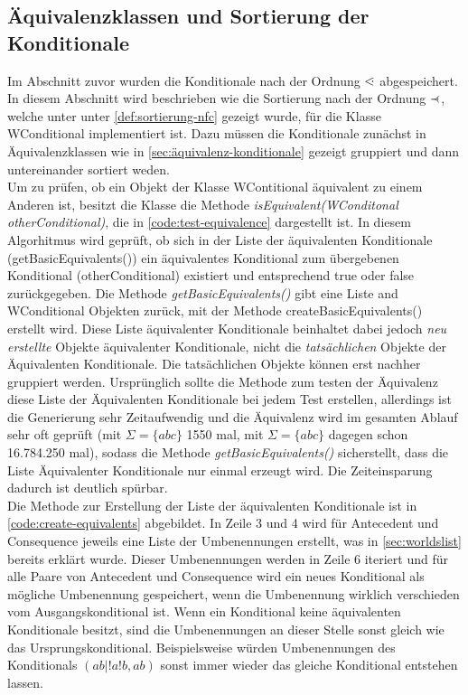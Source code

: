 \documentclass[12pt,a4paper]{article}
\newcommand\dotl{\mathrel{%
    \mathchoice{\QEQ}{\QEQ}{\QEQ}{\QEQ}%
}}
\def\QEQ{{%
    \setbox0\hbox{<}%
    \rlap{\hbox to \wd0{\hss \raisebox {0.1pt}{$\ \cdot$\hss}}}\box0
}}
\newcommand\rdotl{\mathrel{%
    \mathchoice{\RQEQ}{\RQEQ}{\RQEQ}{\RQEQ}%
}}
\def\RQEQ{{%
    \setbox0\hbox{$\prec$}%
    \rlap{\hbox to \wd0{\hss \raisebox {0.01pt}{$\ \cdot$\hss}}}\box0
}}
\begin{document}
\subsection{Äquivalenzklassen und Sortierung der Konditionale}

\label{sec:equivalence}

Im Abschnitt zuvor wurden die Konditionale nach der Ordnung $\dotl$ abgespeichert. In diesem Abschnitt wird beschrieben wie die Sortierung nach der Ordnung $\rdotl$, welche unter unter \autoref{def:sortierung-nfc} gezeigt wurde, für die Klasse WConditional implementiert ist. Dazu müssen die Konditionale zunächst in Äquivalenzklassen wie in \autoref{sec:äquivalenz-konditionale} gezeigt gruppiert und dann untereinander sortiert weden. \\
Um zu prüfen, ob ein Objekt der Klasse WContitional äquivalent zu einem Anderen ist, besitzt die Klasse die Methode \textit{isEquivalent(WConditonal otherConditional)}, die in \autoref{code:test-equivalence} dargestellt ist. In diesem Algorhitmus wird geprüft, ob sich in der Liste der äquivalenten Konditionale (getBasicEquivalents()) ein äquivalentes Konditional zum übergebenen Konditional (otherConditional) existiert und entsprechend true oder false zurückgegeben. Die Methode \textit{getBasicEquivalents()} gibt eine Liste and WConditional Objekten zurück, mit der Methode createBasicEquivalents() erstellt wird. Diese Liste äquivalenter Konditionale beinhaltet dabei jedoch \textit{neu erstellte} Objekte äquivalenter Konditionale, nicht die \textit{tatsächlichen} Objekte der Äquivalenten Konditionale. Die tatsächlichen Objekte können erst nachher gruppiert werden. Ursprünglich sollte die Methode zum testen der Äquivalenz diese Liste der Äquivalenten Konditionale bei jedem Test erstellen, allerdings ist die Generierung sehr Zeitaufwendig und die Äquivalenz wird im gesamten Ablauf sehr oft geprüft (mit $\Sigma=\{abc \}$ 1550 mal, mit $\Sigma=\{abc\}$ dagegen schon 16.784.250 mal), sodass die Methode \textit{getBasicEquivalents()} sicherstellt, dass die Liste Äquivalenter Konditionale nur einmal erzeugt wird. Die Zeiteinsparung dadurch ist deutlich spürbar.\\ 
Die Methode zur Erstellung der Liste der äquivalenten Konditionale ist in \autoref{code:create-equivalents} abgebildet. In Zeile 3 und 4 wird für Antecedent und Consequence jeweils eine Liste der Umbenennungen erstellt, was in \autoref{sec:worldslist} bereits erklärt wurde. Dieser Umbenennungen werden in Zeile 6 iteriert und für alle Paare von Antecedent und Consequence wird ein neues Konditional als mögliche Umbenennung gespeichert, wenn die Umbenennung wirklich verschieden vom Ausgangskonditional ist. Wenn ein Konditional keine äquivalenten Konditionale besitzt, sind die Umbenennungen an dieser Stelle sonst gleich wie das Ursprungskonditional. Beispielsweise würden Umbenennungen des Konditionals $(ab|!a!b,ab)$ sonst immer wieder das gleiche Konditional entstehen lassen.
\end{document}
